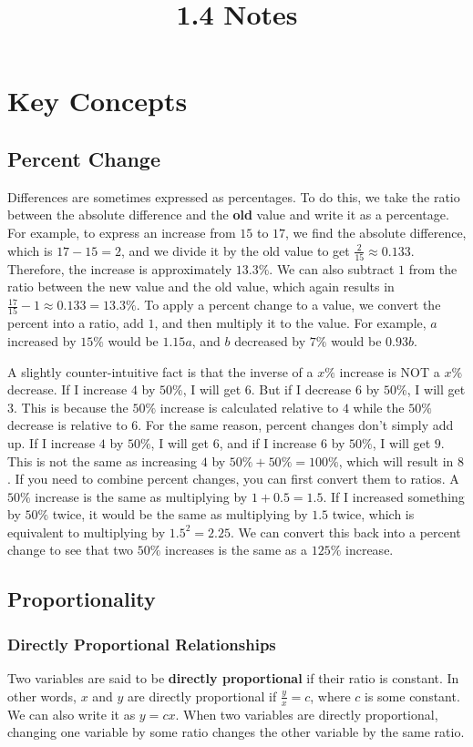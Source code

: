 \documentclass{article}
\title{1.4 Notes}
\author{}
\date{}
\begin{document}
    \maketitle
    \section*{Key Concepts}
    \subsection*{Percent Change}
    Differences are sometimes expressed as percentages. To do this, we take the ratio between the absolute difference and the \textbf{old} value and write it as a percentage. For example, to express an increase from $15$ to $17$, we find the absolute difference, which is $17 - 15 = 2$, and we divide it by the old value to get $\frac{2}{15} \approx 0.133$. Therefore, the increase is approximately $13.3\%$. We can also subtract $1$ from the ratio between the new value and the old value, which again results in $\frac{17}{15} - 1 \approx 0.133 = 13.3\%$. To apply a percent change to a value, we convert the percent into a ratio, add $1$, and then multiply it to the value. For example, $a$ increased by $15\%$ would be $1.15a$, and $b$ decreased by $7\%$ would be $0.93b$.
    
    A slightly counter-intuitive fact is that the inverse of a $x\%$ increase is NOT a $x\%$ decrease. If I increase $4$ by $50\%$, I will get $6$. But if I decrease $6$ by $50\%$, I will get $3$. This is because the $50\%$ increase is calculated relative to $4$ while the $50\%$ decrease is relative to $6$. For the same reason, percent changes don't simply add up. If I increase $4$ by $50\%$, I will get $6$, and if I increase $6$ by $50\%$, I will get $9$. This is not the same as increasing $4$ by $50\% + 50\% = 100\%$, which will result in $8$. If you need to combine percent changes, you can first convert them to ratios. A $50\%$ increase is the same as multiplying by $1 + 0.5 = 1.5$. If I increased something by $50\%$ twice, it would be the same as multiplying by $1.5$ twice, which is equivalent to multiplying by $1.5^2 = 2.25$. We can convert this back into a percent change to see that two $50\%$ increases is the same as a $125\%$ increase.
    \subsection*{Proportionality}
    \subsubsection*{Directly Proportional Relationships}
    Two variables are said to be \textbf{directly proportional} if their ratio is constant. In other words, $x$ and $y$ are directly proportional if $\frac{y}{x} = c$, where $c$ is some constant. We can also write it as $y = cx$. When two variables are directly proportional, changing one variable by some ratio changes the other variable by the same ratio.
\end{document}

